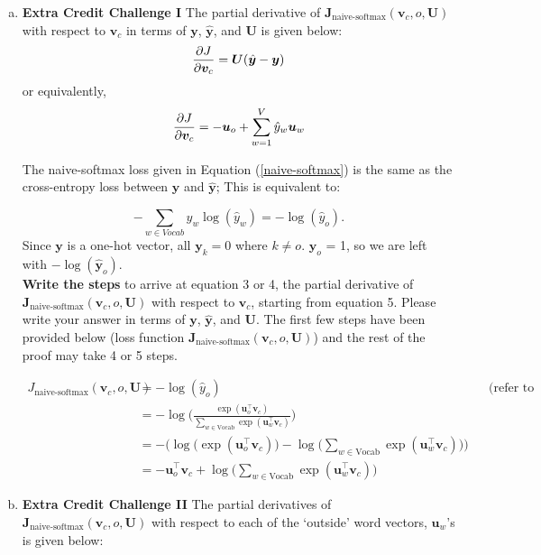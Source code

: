 \begin{enumerate}[(a)]
    \item {} \textbf{Extra Credit Challenge I} \newline
        The partial derivative of $\bm J_{\text{naive-softmax}}(\bm v_c, o, \bm U)$ with respect to $\bm v_c$ in terms of  $\bm y$, $\hat{\bm y}$, and $\bm U$ is given below:
        \begin{equation}
            {\partial J \over \partial \bm v_c} = \bm U(\hat{\bm y} - \bm y) 
        \end{equation}
        or equivalently,
        \begin{equation}
            {\partial J \over \partial \bm v_c} = -\bm u_o + \sum_{w=1}^{V} \hat{y}_w \bm u_w  
        \end{equation}

        The naive-softmax loss given in Equation (\ref{naive-softmax}) is the same as the cross-entropy loss between $\bm y$ and $\hat{\bm y}$; This is equivalent to:

        \begin{equation} 
        -\sum_{w \in Vocab} y_w \log(\hat{y}_w) = - \log (\hat{y}_o).
        \end{equation}
        \newline
        Since $\bm y$ is a one-hot vector, all $\bm y_{k} = 0$ where $k \neq o$. $\bm y_o$ = 1, so we are left with $- \log (\hat{\bm{y}}_o)$.
        \\[0.5in]
        \textbf{Write the steps} to arrive at equation 3 or 4, the partial derivative of $\bm J_{\text{naive-softmax}}(\bm v_c, o, \bm U)$ with respect to $\bm v_c$, starting from equation 5. Please write your answer in terms of $\bm y$, $\hat{\bm y}$, and $\bm U$. The first few steps have been provided below (loss function $\bm J_{\text{naive-softmax}}(\bm v_c, o, \bm U)$) and the rest of the proof may take 4 or 5 steps.

        \begin{align*}
            J_{\text{naive-softmax}}(\bm v_c, o, \bm U) &= - \log (\hat{y}_o) &&\text{(refer to equation 5)}\\
            &= -\log \bigg( \frac{\exp(\bm u_{o}^\top \bm v_c)}{\sum_{w \in \text{Vocab}} \exp(\bm u_{w}^\top \bm v_c)} \bigg) \\
            &= -\bigg( \log\big(\exp(\bm u_{o}^\top \bm v_c)\big) - \log \big( \sum_{w \in \text{Vocab}} \exp(\bm u_{w}^\top \bm v_c) \big) \bigg) \\
            &= - \bm u_{o}^\top \bm v_c + \log \big( \sum_{w \in \text{Vocab}} \exp(\bm u_{w}^\top \bm v_c) \big)     
        \end{align*}
    \item {} \textbf{Extra Credit Challenge II} \newline
        The partial derivatives of $\bm J_{\text{naive-softmax}}(\bm v_c, o, \bm U)$ with respect to each of the `outside' word vectors, $\bm u_w$'s is given below:


\end{enumerate}
